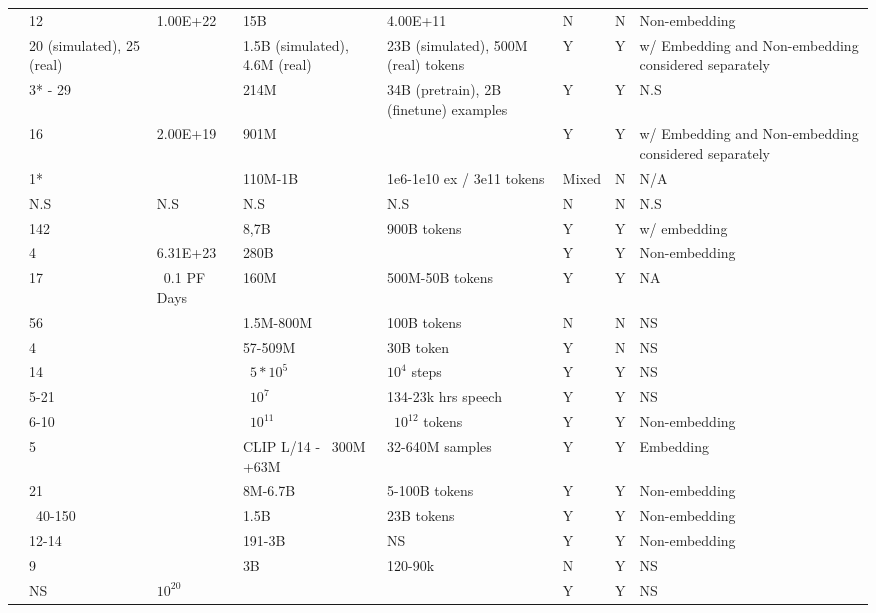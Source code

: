 \begin{table}[]
{\begin{tabular}{llllllll}
\cite{anil2023palm} & 12 & 1.00E+22 & 15B & 4.00E+11 & N & N & Non-embedding \\
\cite{pearce2024reconciling} & 20 (simulated), 25 (real) &  & 1.5B (simulated), 4.6M (real) & 23B (simulated), 500M (real) tokens & Y & Y & w/ Embedding and Non-embedding considered separately \\
\cite{cherti2023reproducible} & 3* - 29 &  & 214M & 34B (pretrain), 2B (finetune) examples  & Y & Y & N.S \\
\cite{porian2024resolving} & 16 & 2.00E+19 & 901M &  & Y & Y & w/ Embedding and Non-embedding considered separately \\
\cite{alabdulmohsin2022revisiting} & 1* &  & 110M-1B & 1e6-1e10 ex / 3e11 tokens & Mixed & N & N/A \\
\cite{gao2024scalingevaluatingsparseautoencoders} & N.S & N.S & N.S & N.S & N & N & N.S \\
\cite{muennighoff2024scaling} & 142 &  & 8,7B & 900B tokens & Y & Y & w/ embedding \\
\cite{rae2021scaling} & 4 & 6.31E+23 & 280B &  & Y & Y & Non-embedding \\
\cite{shin2023scaling} & 17 & ~0.1 PF Days & 160M & 500M-50B tokens & Y & Y & NA \\
\cite{hernandez2022scaling} & 56 &  & 1.5M-800M & 100B tokens & N & N & NS \\
\cite{filipovich2022scaling} & 4 &  & 57-509M & 30B token & Y & N & NS \\
\cite{neumann2022scaling} & 14 &  & ~$5*10^5$ & $10^4$ steps & Y & Y & NS \\
\cite{droppo2021scaling} & 5-21 &  & ~$10^7$ & 134-23k hrs speech & Y & Y & NS \\
\cite{henighan2020scaling} & 6-10 &  & ~$10^11$ & ~$10^12$ tokens & Y & Y & Non-embedding \\
\cite{goyal2024scaling} & 5 &  & CLIP L/14 - ~300M +63M & 32-640M samples & Y & Y & Embedding \\
\cite{aghajanyan2023scaling} & 21 &  & 8M-6.7B & 5-100B tokens & Y & Y & Non-embedding \\
\cite{kaplan2020scaling} & ~40-150 &  & 1.5B & 23B tokens & Y & Y & Non-embedding \\
\cite{ghorbani2021scaling} & 12-14 &  & 191-3B & NS & Y & Y & Non-embedding \\
\cite{gao2023scaling} & 9 &  & 3B & 120-90k & N & Y & NS \\
\cite{hilton2023scaling} & NS & $10^{20}$ &  &  & Y & Y & NS \\

\end{tabular}}
\end{table}
